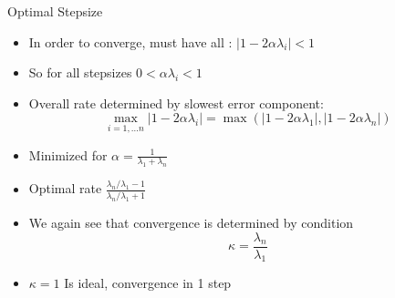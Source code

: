 \documentclass[11pt,compress,t,notes=noshow, xcolor=table]{beamer}
\begin{document}
\begin{vbframe}{Optimal Stepsize}

\begin{itemize}


\item In order to converge, must have all : $ | 1 - 2 \alpha \lambda_i| < 1$ 

\item So for all stepsizes $0  < \alpha \lambda_i < 1 $

\item Overall rate determined by slowest error component: 
$$ \max \limits_{i = 1, \ldots n} | 1 - 2 \alpha \lambda_i| =  \max (| 1 - 2 \alpha \lambda_1|, | 1 - 2 \alpha \lambda_n| )$$

\item Minimized for $ \alpha = \frac{1} {\lambda_1 + \lambda_n}$

\item Optimal rate 
$\frac{\lambda_n / \lambda_1 - 1}{\lambda_n / \lambda_1 + 1}  $

\item We again see that convergence is determined by condition $$\kappa = \frac{\lambda_n}{\lambda_1}$$

\item $\kappa=1$ Is ideal, convergence in 1 step

\end{itemize}
\end{vbframe}


\endlecture
\end{document}
